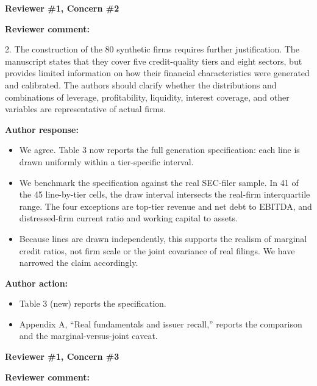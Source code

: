 \documentclass[11pt]{article}
\newcommand{\rvcomment}[1]{{\color{ReviewerGreen}#1}}
\newcommand{\concern}[1]{\textbf{\color{ReviewerGreen}#1}}
\begin{document}
\vspace{12pt}
\concern{Reviewer \#1, Concern \#2}

\concern{Reviewer comment:}

\rvcomment{2. The construction of the 80 synthetic firms requires further justification. The manuscript states that they cover five credit-quality tiers and eight sectors, but provides limited information on how their financial characteristics were generated and calibrated. The authors should clarify whether the distributions and combinations of leverage, profitability, liquidity, interest coverage, and other variables are representative of actual firms.}

\textbf{Author response:}

\begin{itemize}

\item We agree. Table 3 now reports the full generation specification: each line is drawn uniformly within a tier-specific interval.

\item We benchmark the specification against the real SEC-filer sample. In 41 of the 45 line-by-tier cells, the draw interval intersects the real-firm interquartile range. The four exceptions are top-tier revenue and net debt to EBITDA, and distressed-firm current ratio and working capital to assets.

\item Because lines are drawn independently, this supports the realism of marginal credit ratios, not firm scale or the joint covariance of real filings. We have narrowed the claim accordingly.

\end{itemize}

\textbf{Author action:}

\begin{itemize}

\item Table 3 (new) reports the specification.

\item Appendix A, ``Real fundamentals and issuer recall,'' reports the comparison and the marginal-versus-joint caveat.

\end{itemize}

\vspace{12pt}
\concern{Reviewer \#1, Concern \#3}

\concern{Reviewer comment:}
\end{document}
